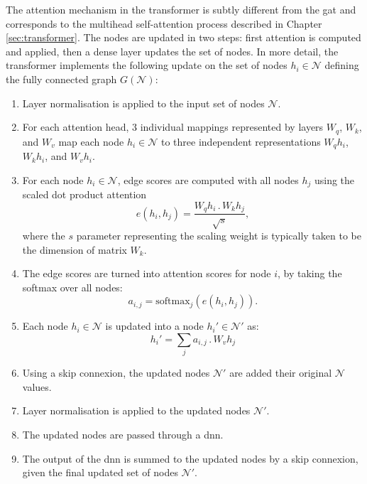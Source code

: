 The attention mechanism in the transformer is subtly different from the \gls{gat} and corresponds to the multihead self-attention process described in Chapter \ref{sec:transformer}. The nodes are updated in two steps: first attention is computed and applied, then a dense layer updates the set of nodes. In more detail, the transformer implements the following update on the set of nodes $h_i \in \mathcal{N}$ defining the fully connected graph $G(\mathcal{N})$:
\begin{enumerate}
  \item Layer normalisation is applied to the input set of nodes $\mathcal{N}$.
  \item For each attention head, 3 individual mappings represented by layers $W_q$, $W_k$, and $W_v$ map each node $h_i \in \mathcal{N}$ to three independent representations $W_qh_i$, $W_kh_i$, and $W_vh_i$.
  \item For each node $h_i \in \mathcal{N}$, edge scores are computed with all nodes $h_j$ using the scaled dot product attention \[e\left(h_i, h_j\right) = \frac{W_q h_i\, . \, W_k h_j}{\sqrt{s}},\] where the $s$ parameter representing the scaling weight is typically taken to be the dimension of matrix $W_k$. 
  \item The edge scores are turned into attention scores for node $i$, by taking the softmax over all nodes: \[a_{i, j} = \textrm{softmax}_j\left(e(h_i, h_j) \right).\]
  \item Each node $h_i \in \mathcal{N}$ is updated into a node $h_i' \in \mathcal{N}'$ as: \[h_i' = \sum_j a_{i, j} \,.\, W_v h_j\]
  \item Using a skip connexion, the updated nodes $\mathcal{N}'$ are added their original $\mathcal{N}$ values. 
  \item Layer normalisation is applied to the updated nodes $\mathcal{N}'$.
  \item The updated nodes are passed through a \gls{dnn}.
  \item The output of the \gls{dnn} is summed to the updated nodes by a skip connexion, given the final updated set of nodes $\mathcal{N}'$.
\end{enumerate}

